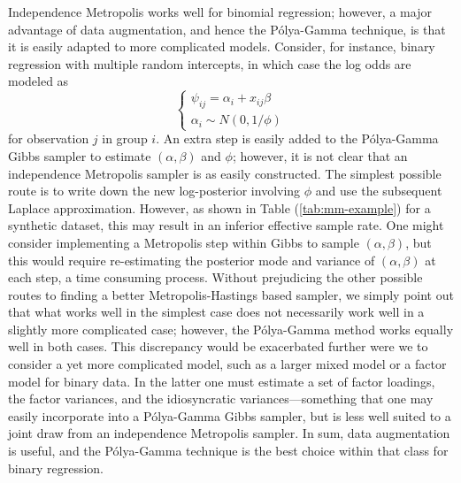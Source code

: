 \documentclass{article}
\newcommand{\Polya}{P\'{o}lya}
\begin{document}
Independence Metropolis works well for binomial regression; however, a major
advantage of data augmentation, and hence the \Polya-Gamma technique, is that it
is easily adapted to more complicated models.  Consider, for instance, binary
regression with multiple random intercepts, in which case the log odds are
modeled as
\[
\begin{cases}
\psi_{ij} = \alpha_i + x_{ij} \beta \\
\alpha_i \sim N(0, 1/\phi)
\end{cases}
\]
for observation $j$ in group $i$.  An extra step is easily added to the
\Polya-Gamma Gibbs sampler to estimate $(\alpha, \beta)$ and $\phi$; however, it
is not clear that an independence Metropolis sampler is as easily constructed.
The simplest possible route is to write down the new log-posterior involving
$\phi$ and use the subsequent Laplace approximation.  However, as shown in Table
(\ref{tab:mm-example}) for a synthetic dataset, this may result in an inferior
effective sample rate.  One might consider implementing a Metropolis step within
Gibbs to sample $(\alpha,\beta)$, but this would require re-estimating the
posterior mode and variance of $(\alpha,\beta)$ at each step, a time consuming
process.  Without prejudicing the other possible routes to finding a better
Metropolis-Hastings based sampler, we simply point out that what works well in
the simplest case does not necessarily work well in a slightly more complicated
case; however, the \Polya-Gamma method works equally well in both cases.  This
discrepancy would be exacerbated further were we to consider a yet more
complicated model, such as a larger mixed model or a factor model for binary
data.  In the latter one must estimate a set of factor loadings, the factor
variances, and the idiosyncratic variances---something that one may easily
incorporate into a \Polya-Gamma Gibbs sampler, but is less well suited to a
joint draw from an independence Metropolis sampler.  In sum, data augmentation
is useful, and the \Polya-Gamma technique is the best choice within that class
for binary regression.
\end{document}

